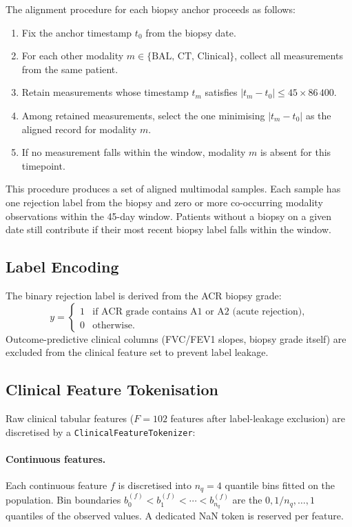 \documentclass[11pt,a4paper]{article}
\begin{document}
The alignment procedure for each biopsy anchor proceeds as follows:
\begin{enumerate}
    \item Fix the anchor timestamp $t_0$ from the biopsy date.
    \item For each other modality $m \in \{\text{BAL, CT, Clinical}\}$, collect
          all measurements from the same patient.
    \item Retain measurements whose timestamp $t_m$ satisfies
          $|t_m - t_0| \leq 45 \times 86\,400$.
    \item Among retained measurements, select the one minimising $|t_m - t_0|$
          as the aligned record for modality $m$.
    \item If no measurement falls within the window, modality $m$ is absent for
          this timepoint.
\end{enumerate}

This procedure produces a set of aligned multimodal samples.
Each sample has one rejection label from the biopsy and zero or more
co-occurring modality observations within the 45-day window.
Patients without a biopsy on a given date still contribute if their most
recent biopsy label falls within the window.

\subsection{Label Encoding}

The binary rejection label is derived from the ACR biopsy grade:
\begin{equation}
    y =
    \begin{cases}
        1 & \text{if ACR grade contains A1 or A2 (acute rejection),} \\
        0 & \text{otherwise.}
    \end{cases}
\end{equation}
Outcome-predictive clinical columns (FVC/FEV1 slopes, biopsy grade itself) are
excluded from the clinical feature set to prevent label leakage.

\subsection{Clinical Feature Tokenisation}

Raw clinical tabular features ($F = 102$ features after label-leakage
exclusion) are discretised by a \texttt{ClinicalFeatureTokenizer}:

\paragraph{Continuous features.}
Each continuous feature $f$ is discretised into $n_q = 4$ quantile bins fitted
on the population.
Bin boundaries $b_0^{(f)} < b_1^{(f)} < \cdots < b_{n_q}^{(f)}$ are the
$0, 1/n_q, \ldots, 1$ quantiles of the observed values.
A dedicated NaN token is reserved per feature.
\end{document}
